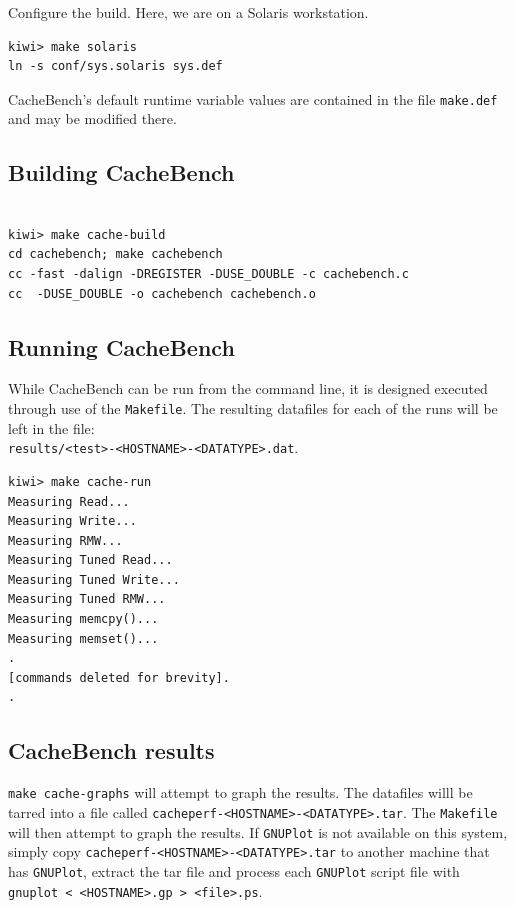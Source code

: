 \documentclass [12pt]{article}
\begin{document}
Configure the build. Here, we are on a Solaris workstation.

\begin{verbatim}
kiwi> make solaris
ln -s conf/sys.solaris sys.def

\end{verbatim}

CacheBench's default runtime variable values are contained in the file {\tt make.def} and may
be modified there.

\subsection{Building CacheBench}

\begin{verbatim}

kiwi> make cache-build
cd cachebench; make cachebench
cc -fast -dalign -DREGISTER -DUSE_DOUBLE -c cachebench.c 
cc  -DUSE_DOUBLE -o cachebench cachebench.o 

\end{verbatim}

\subsection{Running CacheBench}

While CacheBench can be run from the command line, it is designed executed
through use of the {\tt Makefile}. The resulting datafiles for each of the runs 
will be left in the file: \\
{\tt results/<test>-<HOSTNAME>-<DATATYPE>.dat}. \\

\begin{verbatim}
kiwi> make cache-run
Measuring Read...
Measuring Write...
Measuring RMW...
Measuring Tuned Read...
Measuring Tuned Write...
Measuring Tuned RMW...
Measuring memcpy()...
Measuring memset()...
.
[commands deleted for brevity].
.
\end{verbatim}

\subsection{CacheBench results}

{\tt make cache-graphs} will attempt to graph
the results. The datafiles willl be tarred into a file called {\tt cacheperf-<HOSTNAME>-<DATATYPE>.tar}.
The {\tt Makefile} will then attempt to graph the results.
If {\tt GNUPlot} is not available on this system, simply copy
{\tt cacheperf-<HOSTNAME>-<DATATYPE>.tar} to another machine that has
{\tt GNUPlot}, extract the tar file and process each {\tt GNUPlot} script file
with {\tt gnuplot < <HOSTNAME>.gp > <file>.ps}.
\end{document}
